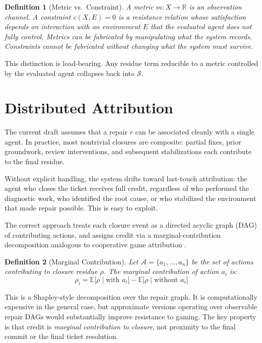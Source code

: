 \documentclass[12pt]{article}
\newtheorem{definition}{Definition}
\begin{document}
\begin{definition}[Metric vs.\ Constraint]
A \emph{metric} $m : X \to \mathbb{R}$ is an observation channel. A
\emph{constraint} $c(X, E) = 0$ is a resistance relation whose
satisfaction depends on interaction with an environment $E$ that the
evaluated agent does not fully control. Metrics can be fabricated by
manipulating what the system records. Constraints cannot be fabricated
without changing what the system must survive.
\end{definition}

This distinction is load-bearing. Any residue term reducible to a metric
controlled by the evaluated agent collapses back into $\mathcal{S}$.

\section{Distributed Attribution}

The current draft assumes that a repair $r$ can be associated cleanly
with a single agent. In practice, most nontrivial closures are
composite: partial fixes, prior groundwork, review interventions, and
subsequent stabilizations each contribute to the final residue.

Without explicit handling, the system drifts toward last-touch
attribution: the agent who closes the ticket receives full credit,
regardless of who performed the diagnostic work, who identified the root
cause, or who stabilized the environment that made repair possible. This
is easy to exploit.

The correct approach treats each closure event as a directed acyclic
graph (DAG) of contributing actions, and assigns credit via a
marginal-contribution decomposition analogous to cooperative game
attribution \cite{shapley1953,roughgarden2016}.

\begin{definition}[Marginal Contribution]
Let $\mathcal{A} = \{a_1, \ldots, a_n\}$ be the set of actions
contributing to closure residue $\rho$. The marginal contribution of
action $a_i$ is:
\[
  \rho_i =
    \mathbb{E}\bigl[\rho \mid \text{with } a_i\bigr]
    - \mathbb{E}\bigl[\rho \mid \text{without } a_i\bigr]
\]
\end{definition}

This is a Shapley-style decomposition \cite{shapley1953} over the repair graph. It is
computationally expensive in the general case, but approximate versions
operating over observable repair DAGs would substantially improve
resistance to gaming. The key property is that credit is \emph{marginal
contribution to closure}, not proximity to the final commit or the final
ticket resolution.
\end{document}
